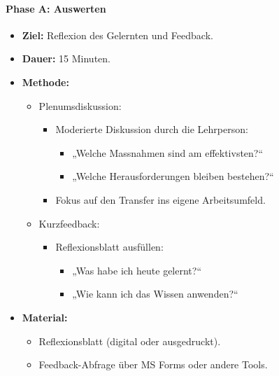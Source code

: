 \documentclass[
11pt,
captions=tableheading,
smallheadings,
headsepline,
footsepline, 
captions=tableheading,
parskip=half-,
]{scrartcl}
\begin{document}
\paragraph{Phase A: Auswerten}
\begin{itemize}
    \item \textbf{Ziel:} Reflexion des Gelernten und Feedback.
    \item \textbf{Dauer:} 15 Minuten.
    \item \textbf{Methode:}
          \begin{itemize}
              \item Plenumsdiskussion:
                    \begin{itemize}
                        \item Moderierte Diskussion durch die Lehrperson:
                              \begin{itemize}
                                  \item „Welche Massnahmen sind am effektivsten?“
                                  \item „Welche Herausforderungen bleiben bestehen?“
                              \end{itemize}
                        \item Fokus auf den Transfer ins eigene Arbeitsumfeld.
                    \end{itemize}
              \item Kurzfeedback:
                    \begin{itemize}
                        \item Reflexionsblatt ausfüllen:
                              \begin{itemize}
                                  \item „Was habe ich heute gelernt?“
                                  \item „Wie kann ich das Wissen anwenden?“
                              \end{itemize}
                    \end{itemize}
          \end{itemize}
    \item \textbf{Material:}
          \begin{itemize}
              \item Reflexionsblatt (digital oder ausgedruckt).
              \item Feedback-Abfrage über MS Forms oder andere Tools.
          \end{itemize}
\end{itemize}
\end{document}
